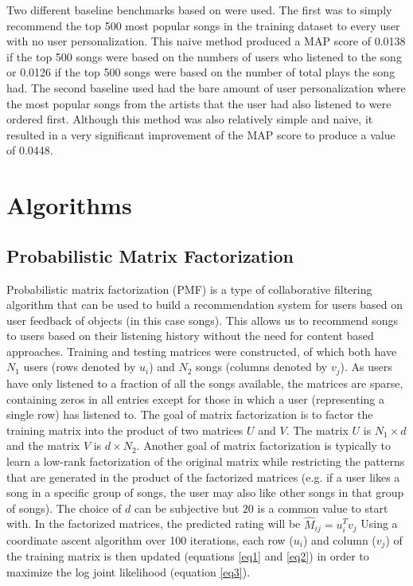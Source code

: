 \documentclass[11pt,preprint]{aastex}
\newcommand{\TRANSPOSE}{\ensuremath{T}}
\begin{document}
Two different baseline benchmarks based on \citet{McFee:2012:MSD:2187980.2188222} were used. The first was to simply recommend the top 500 most popular songs in the training dataset to every user with no user personalization. This naive method produced a MAP score of 0.0138 if the top 500 songs were based on the numbers of users who listened to the song or 0.0126 if the top 500 songs were based on the number of total plays the song had. The second baseline used had the bare amount of user personalization where the most popular songs from the artists that the user had also listened to were ordered first. Although this method was also relatively simple and naive, it resulted in a very significant improvement of the MAP score to produce a value of 0.0448.

\section{Algorithms}

\subsection{Probabilistic Matrix Factorization}
Probabilistic matrix factorization (PMF) is a type of collaborative filtering algorithm that can be used to build a recommendation system for users based on user feedback of objects (in this case songs). This allows us to recommend songs to users based on their listening history without the need for content based approaches. 
Training and testing matrices were constructed, of which both have $N_1$ users (rows denoted by $u_i$) and $N_2$ songs (columns denoted by $v_j$). As users have only listened to a fraction of all the songs available, the matrices are sparse, containing zeros in all entries except for those in which a user (representing a single row) has listened to. The goal of matrix factorization is to factor the training matrix into the product of two matrices $U$ and $V$.  The matrix $U$ is $N_1 \times d$ and the matrix $V$ is $d \times N_2$. Another goal of matrix factorization is typically to learn a low-rank factorization of the original matrix while restricting the patterns that are generated in the product of the factorized matrices (e.g. if a user likes a song in a specific group of songs, the user may also like other songs in that group of songs). The choice of $d$ can be subjective but $20$ is a common value to start with. In the factorized matrices, the predicted rating will be $\hat{M}_{ij} = u_i^\TRANSPOSE  v_j$
Using a coordinate ascent algorithm over 100 iterations, each row ($u_i$) and column ($v_j$) of the training matrix is then updated (equations \ref{eq1} and \ref{eq2}) in order to maximize the log joint likelihood (equation \ref{eq3}).
\end{document}
